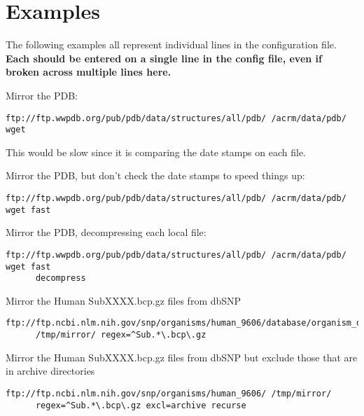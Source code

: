 \documentclass{article}
\begin{document}
\section{Examples}
The following examples all represent individual lines in the
 configuration file. {\bfseries Each should be entered on a single
 line in the config file, even if broken across multiple lines here.}
\vspace{1em}

\noindent Mirror the PDB:
{\footnotesize
\begin{verbatim}
ftp://ftp.wwpdb.org/pub/pdb/data/structures/all/pdb/ /acrm/data/pdb/ wget
\end{verbatim}
}
This would be slow since it is comparing the date stamps on each
file.
\vspace{1em}

\noindent Mirror the PDB, but don't check the date stamps to speed things up:
{\footnotesize
\begin{verbatim}
ftp://ftp.wwpdb.org/pub/pdb/data/structures/all/pdb/ /acrm/data/pdb/ wget fast
\end{verbatim}
}
\vspace{1em}

\noindent Mirror the PDB, decompressing each local file:
{\footnotesize
\begin{verbatim}
ftp://ftp.wwpdb.org/pub/pdb/data/structures/all/pdb/ /acrm/data/pdb/ wget fast 
      decompress
\end{verbatim}
}
\vspace{1em}

\noindent Mirror the Human SubXXXX.bcp.gz files from dbSNP
{\footnotesize
\begin{verbatim}
ftp://ftp.ncbi.nlm.nih.gov/snp/organisms/human_9606/database/organism_data/ 
      /tmp/mirror/ regex=^Sub.*\.bcp\.gz
\end{verbatim}
}
\vspace{1em}

\noindent Mirror the Human SubXXXX.bcp.gz files from dbSNP but exclude
those that are in archive directories
{\footnotesize
\begin{verbatim}
ftp://ftp.ncbi.nlm.nih.gov/snp/organisms/human_9606/ /tmp/mirror/ 
      regex=^Sub.*\.bcp\.gz excl=archive recurse
\end{verbatim}
}
\end{document}
